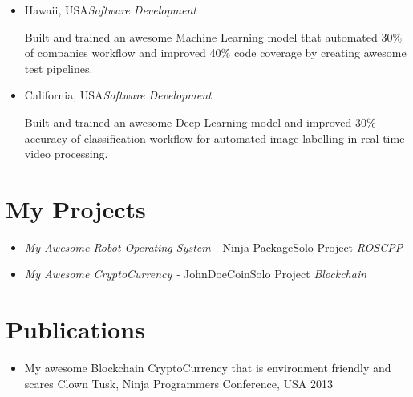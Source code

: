 \documentclass[11pt,a4paper,roman]{moderncv}
\begin{document}
\begin{itemize}

	\item{
	{Hawaii, USA}{\textit{Software Development}}{}}
	\vspace{3pt}

	\small{Built and trained an awesome Machine Learning model that automated 30\% of companies
	workflow and improved 40\% code coverage by creating awesome test pipelines.}
	
	\vspace{6pt}
	
	\item{
	{California, USA}{\textit{Software Development}}{}}
	\vspace{3pt}

	\small{Built and trained an awesome Deep Learning model and improved 30\% accuracy of
	classification workflow for automated image labelling in real-time video processing.}
	
\end{itemize}

\section{My Projects}

\begin{itemize}

	\vspace{5pt}
	\item{
	{\emph{My Awesome Robot Operating System - } Ninja-Package}{Solo Project}
	{\textit{ROSCPP}}{}}
	
	\vspace{5pt}
	\item{
	{\emph{My Awesome CryptoCurrency - } JohnDoeCoin}{Solo Project}
	{\textit{Blockchain}}{}}
	
\end{itemize}

\section{Publications}

\vspace{6pt}

\begin{itemize}
	\item{My awesome Blockchain CryptoCurrency that is environment friendly and scares Clown Tusk, Ninja Programmers Conference, USA 2013}
\end{itemize}
\end{document}
